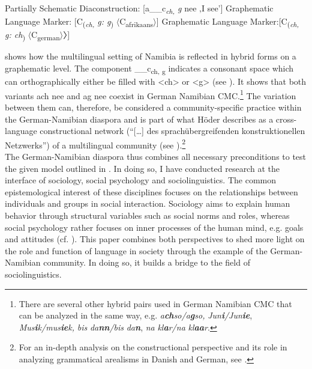 \documentclass[output=paper]{langsci/langscibook}
\begin{document}
\ea
\label{ex:radke:2}
 	\ea \label{ex:radke:2a} 
 	Partially Schematic Diaconstruction: {[}a\_\_c\textit{\textsubscript{ch,} \textit{g}}\textsubscript{} nee ‚I see’{]}
	\ex \label{ex:radke:2b}
 	Graphematic Language Marker: {[}C\textsubscript{(}\textit{\textsubscript{ch,} \textit{g:} \textit{g}}\textsubscript{)} $\langle$C\textsubscript{afrikaans}$\rangle${]}
	\ex\label{ex:radke:}
 	Graphematic Language Marker:{[}C\textsubscript{(}\textit{\textsubscript{ch,} \textit{g:} \textit{ch}}\textsubscript{)} $\langle$C\textsubscript{german}$\rangle$〉{]} 
\z
\z

 shows how the multilingual setting of Namibia is reflected in hybrid forms on a graphematic level. The component \_\_c\textsubscript{ch, g}   {indicates a consonant space which can orthographically either be filled with <ch> or <g> (see \citealt[16]{hoder_mehrsprachige_2018}). It shows that both variants} ach nee   {and} ag nee   {coexist in German Namibian CMC.}\footnote{There are several other hybrid pairs used in German Namibian CMC that can be analyzed in the same way, e.g. \textit{a}\textbf{\textit{ch}}\textit{so/a}\textbf{\textit{g}}\textit{so,} \textit{Jun}\textbf{\textit{i}}\textit{/Jun}\textbf{\textit{ie}}, \textit{Mus}\textbf{\textit{i}}\textit{k/mus}\textbf{\textit{ie}}\textit{k,} \textit{bis} \textit{da}\textbf{\textit{nn}}\textit{/bis} \textit{da}\textbf{\textit{n}}, \textit{na} \textit{kl}\textbf{\textit{a}}\textit{r/na} \textit{kl}\textbf{\textit{aa}}\textit{r}.}  The variation between them can, therefore, be considered a community-specific practice within the German-Namibian diaspora and is part of what Höder describes as a cross-language constructional network (“[…] des sprachübergreifenden konstruktionellen Netzwerks”) of a multilingual community (see \citealt[15]{hoder_mehrsprachige_2018}).\footnote{For an in-depth analysis on the constructional perspective and its role in analyzing  grammatical arealisms in Danish and German, see .}\\%
The German-Namibian diaspora thus combines all necessary preconditions to test the given model outlined in . In doing so, I have conducted research at the interface of sociology, social psychology and sociolinguistics. The common epistemological interest of these disciplines focuses on the relationships between individuals and groups in social interaction. Sociology aims to explain human behavior through structural variables such as social norms and roles, whereas social psychology rather focuses on inner processes of the human mind, e.g. goals and attitudes (cf. \citealt[11]{jonas_sozialpsychologie_2014}). This paper combines both perspectives to shed more light on the role and function of language in society through the example of the German-Namibian community. In doing so, it builds a bridge to the field of sociolinguistics.
\end{document}
